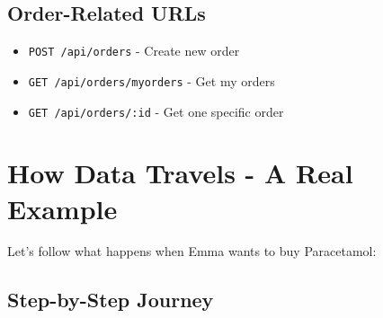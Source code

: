 \documentclass[12pt]{article}
\begin{document}
\subsection{Order-Related URLs}

\begin{itemize}
    \item \texttt{POST /api/orders} - Create new order
    \item \texttt{GET /api/orders/myorders} - Get my orders
    \item \texttt{GET /api/orders/:id} - Get one specific order
\end{itemize}

\section{How Data Travels - A Real Example}

Let's follow what happens when Emma wants to buy Paracetamol:

\subsection{Step-by-Step Journey}
\end{document}
